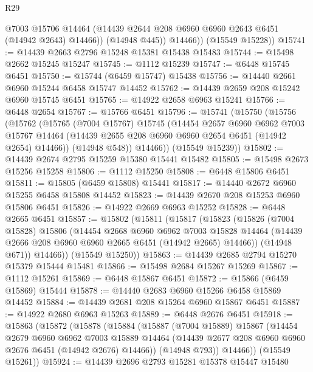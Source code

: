 \begin{lexlean}{R29}
\begin{coremodule}
              @7003
              @15706
              @14464
              (@14439 @2644 @208 @6960 @6960 @2643 @6451 (@14942 @2643) @14466))
            (@14948 @445))
          @14466))
      (@15549 @15228))
@15741 := @14439 @2663 @2796 @15248 @15381 @15438 @15483
@15744 := @15498 @2662 @15245 @15247
@15745 := @1112 @15239
@15747 := @6448 @15745 @6451
@15750 := @15744 (@6459 @15747) @15438
@15756 := @14440 @2661 @6960 @15244 @6458 @15747 @14452
@15762 := @14439 @2659 @208 @15242 @6960 @15745 @6451
@15765 := @14922 @2658 @6963 @15241
@15766 := @6448 @2654
@15767 := @15766 @6451
@15796 := @15741
    (@15750
      (@15756
        (@15762
          (@15765
            (@7004 @15767)
            @15745
            (@14454
              @2657
              @6960
              @6962
              @7003
              @15767
              @14464
              (@14439 @2655 @208 @6960 @6960 @2654 @6451 (@14942 @2654) @14466))
            (@14948 @548))
          @14466))
      (@15549 @15239))
@15802 := @14439 @2674 @2795 @15259 @15380 @15441 @15482
@15805 := @15498 @2673 @15256 @15258
@15806 := @1112 @15250
@15808 := @6448 @15806 @6451
@15811 := @15805 (@6459 @15808) @15441
@15817 := @14440 @2672 @6960 @15255 @6458 @15808 @14452
@15823 := @14439 @2670 @208 @15253 @6960 @15806 @6451
@15826 := @14922 @2669 @6963 @15252
@15828 := @6448 @2665 @6451
@15857 := @15802
    (@15811
      (@15817
        (@15823
          (@15826
            (@7004 @15828)
            @15806
            (@14454
              @2668
              @6960
              @6962
              @7003
              @15828
              @14464
              (@14439 @2666 @208 @6960 @6960 @2665 @6451 (@14942 @2665) @14466))
            (@14948 @671))
          @14466))
      (@15549 @15250))
@15863 := @14439 @2685 @2794 @15270 @15379 @15444 @15481
@15866 := @15498 @2684 @15267 @15269
@15867 := @1112 @15261
@15869 := @6448 @15867 @6451
@15872 := @15866 (@6459 @15869) @15444
@15878 := @14440 @2683 @6960 @15266 @6458 @15869 @14452
@15884 := @14439 @2681 @208 @15264 @6960 @15867 @6451
@15887 := @14922 @2680 @6963 @15263
@15889 := @6448 @2676 @6451
@15918 := @15863
    (@15872
      (@15878
        (@15884
          (@15887
            (@7004 @15889)
            @15867
            (@14454
              @2679
              @6960
              @6962
              @7003
              @15889
              @14464
              (@14439 @2677 @208 @6960 @6960 @2676 @6451 (@14942 @2676) @14466))
            (@14948 @793))
          @14466))
      (@15549 @15261))
@15924 := @14439 @2696 @2793 @15281 @15378 @15447 @15480

\end{coremodule}
\end{lexlean}
